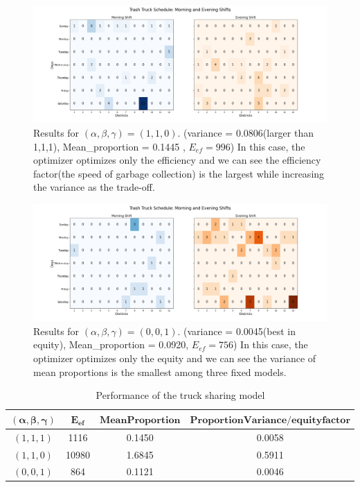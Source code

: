\documentclass{article}
\begin{document}
\begin{figure}[H]
	\centering
	\includegraphics[width=1\textwidth]{figures/figures fixed/Prioritize TCT and TGC fixed model.png}
	\caption{Results for $(\alpha,\beta,\gamma) = (1,1,0)$. (variance = 0.0806(larger than 1,1,1), Mean\_proportion = 0.1445 , $E_{ef} = 996$) In this case, the optimizer optimizes only the efficiency and we can see the efficiency factor(the speed of garbage collection) is the largest while increasing the variance as the trade-off.}
\end{figure}

\begin{figure}[H]
	\centering
	\includegraphics[width=1\textwidth]{figures/figures fixed/PGC fixed model.png}
	\caption{Results for $(\alpha, \beta,\gamma) = (0,0,1)$. (variance = 0.0045(best in equity), Mean\_proportion = 0.0920, $E_{ef}$$ = 756$) In this case, the optimizer optimizes only the equity and we can see the variance of mean proportions is the smallest among three fixed models. }
\end{figure}

\begin{table}[H]
\centering
\begin{tabular}{|c|c|c|c|}
\hline
$\mathbf{(\alpha, \beta,\gamma)}$ & $\mathbf{E_{ef}}$ & $\mathbf{Mean Proportion}$ & $\mathbf{Proportion Variance/equity factor}$ \\ \hline
$(1,1,1)$    &     1116         &  0.1450    &  0.0058      \\ \hline
$(1,1,0)$     &  10980        &  1.6845  &   0.5911  \\ \hline
$(0,0,1)$      &   864         &   0.1121  &  0.0046    \\ \hline
\end{tabular}
\caption{Performance of the truck sharing model}
\label{tab:TruckSharing}
\end{table}
\end{document}
